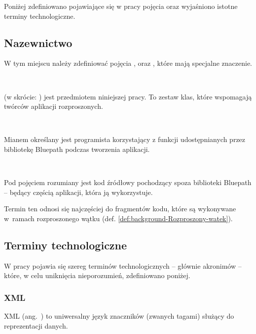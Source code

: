 Poniżej zdefiniowano pojawiające się w pracy pojęcia oraz wyjaśniono
istotne terminy technologiczne.


\subsection{Nazewnictwo}

W tym miejscu należy zdefiniować pojęcia ,
 oraz , które mają
specjalne znaczenie.
\begin{defn}
~

\noindent {} (w skrócie: )
jest przedmiotem niniejszej pracy. To zestaw klas, które wspomagają
twórców aplikacji rozproszonych.
\end{defn}

\begin{defn}
~

\noindent \label{def:podstawy-teorytyczne-uzytkownik}Mianem 
określany jest programista korzystający z funkcji udostępnianych przez
bibliotekę Bluepath podczas tworzenia aplikacji.
\end{defn}

\begin{defn}
~

\noindent Pod pojęciem  rozumiany jest
kod źródłowy pochodzący spoza biblioteki Bluepath -- będący częścią
aplikacji, która ją wykorzystuje. 
\end{defn}
Termin ten odnosi się najczęściej do fragmentów kodu, które są wykonywane
w~ramach rozproszonego wątku (def. \ref{def:background-Rozproszony-watek}). 




\subsection{Terminy technologiczne}

W pracy pojawia się szereg terminów technologicznych -- głównie akronimów
-- które, w celu uniknięcia nieporozumień, zdefiniowano poniżej.


\subsubsection*{XML}

\label{def:background-XML}XML (ang.~)
to uniwersalny język znaczników (zwanych tagami) służący do reprezentacji
danych.




